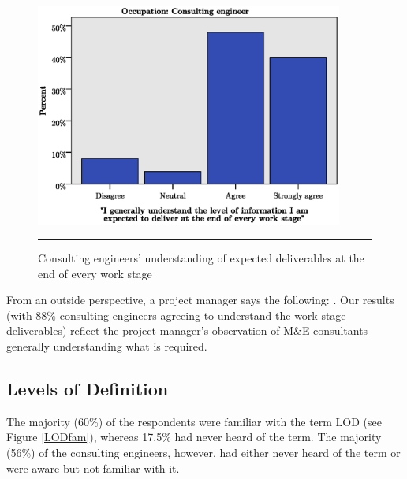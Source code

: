 \begin{figure}[htbp]
	\centering
	\includegraphics[width=0.9\textwidth]{figures/ConsultingXUnderstanding.eps}
	\rule{0.9\textwidth}{0.5pt} %
	\caption{Consulting engineers' understanding of expected deliverables at the end of every work stage}
	\label{consulting_X_understanding}
\end{figure}


From an outside perspective, a project manager says the following: .
Our results (with 88\% consulting engineers agreeing to understand the work stage deliverables) reflect the project manager's observation of M\&E consultants generally understanding what is required.




\subsection{Levels of Definition}

The majority (60\%) of the respondents were familiar with the term LOD (see Figure \ref{LODfam}), whereas 17.5\% had never heard of the term.
The majority (56\%) of the consulting engineers, however, had either never heard of the term or were aware but not familiar with it.

